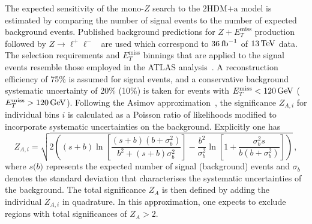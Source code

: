 \documentclass[a4paper, 11pt,notoc]{article}
\newcommand{\MET}{\ensuremath{E_T^\mathrm{miss}}\xspace}
\newcommand{\hdma}{\ensuremath{\textrm{2HDM+a}}\xspace}
\begin{document}
 The expected sensitivity of the mono-$Z$ search to the \hdma model is estimated by comparing the number of  signal events to the number of expected background events. Published background predictions for $Z+\MET$ production followed by $Z \to \ell^+ \ell^-$~\cite{Aaboud:2017bja} are used which correspond to $36 \, {\rm fb}^{-1}$ of $13 \, {\rm TeV}$ data. The selection requirements and \MET binnings that are applied to the signal events resemble those employed in the ATLAS analysis~\cite{Aaboud:2017bja}. A reconstruction efficiency of 75\% is assumed for signal events,  and a conservative background systematic uncertainty of 20\% (10\%) is taken for events with $\MET < 120  \, {\rm GeV}$ ($\MET > 120  \, {\rm GeV}$). Following the Asimov approximation~\cite{Cowan:2010js}, the significance $Z_{A,i}$ for individual bins $i$ is calculated as a Poisson ratio of likelihoods modified to incorporate systematic uncertainties on the background. Explicitly one has \cite{Cowan:2012}
\begin{equation}
\label{eq:significance_wsyst}
Z_{A, i} = \sqrt{ 2 \left ( \left ( s + b \right ) \ln \left [ \frac{\left (s+b \right ) \left (b + \sigma_b^2 \right )}{b^2 + \left ( s +b \right ) \sigma_b^2 } \right ]  - \frac{b^2}{\sigma_b^2} \ln \left [ 1 + \frac{\sigma_b^2 s}{b \left ( b + \sigma_b^2 \right )} \right ] \right ) } \,, 
\end{equation}
where $s \mathrm{(}b\mathrm{)}$ represents the expected number of signal (background) events and $\sigma_b$ denotes the standard deviation that characterises the systematic uncertainties of the background. The total significance $Z_A$ is then defined by adding the individual $Z_{A, i}$ in quadrature.   In this approximation, one expects to exclude regions with total significances of $Z_A > 2$. %
\end{document}
